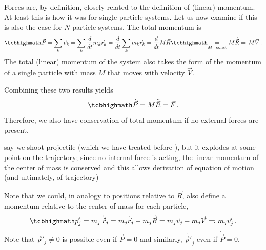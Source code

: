 \documentclass[../class_mech_main.tex]{subfiles}
\begin{document}
Forces are, by definition, closely related to the definition of (linear) momentum. At least this is how it was for single particle systems. Let us now examine if this is also the case for $N$-particle systems. The total momentum is
\begin{equation}
	\eqbox{
		\vec{P}
	} = \sum_k \vec{p}_k = \sum_k \dv{t} m_k \vec{r}_k = \dv{t} \sum_k m_k \vec{r}_k = \dv{t} M \vec{R}
	\eqbox{
		\underset{M = \text{const}}{=} M \dot{\vec{R}} \eqqcolon M \vec{V}
	} \, .
\end{equation}
The total (linear) momentum of the system also takes the form of the momentum of a single particle with mass $M$ that moves with velocity $\vec{V}$.

Combining these two results yields
\begin{equation}
	\eqbox{
		\dot{\vec{P}} = M \ddot{\vec{R}} = \vec{F}
	} \, .
\end{equation}
Therefore, we also have conservation of total momentum if no external forces are present.


\begin{ex}
	say we shoot projectile (which we have treated before ), but it explodes at some point on the trajectory; since no internal force is acting, the linear momentum of the center of mass is conserved and this allows derivation of equation of motion (and ultimately, of trajectory)
\end{ex}


Note that we could, in analogy to positions relative to $\vec{R}$, also define a momentum relative to the center of mass for each particle,
\begin{equation}\label{eq:momentum_in_cms}
	\eqbox{
		\vec{p}'_j
		= m_j \dot{\vec{r}'}_j
		= m_j \dot{\vec{r}}_j - m_j \dot{\vec{R}}
		= m_j \vec{v}_j - m_j \vec{V}
		\eqqcolon m_j \vec{v}'_j
	} \, .
\end{equation}
Note that $\vec{p}'_j \neq 0$ is possible even if $\vec{P} = 0$ and similarly, $\dot{\vec{p}'}_j$ even if $\dot{\vec{P}} = 0$. 
\end{document}
